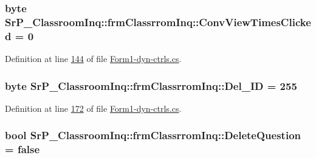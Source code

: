 \hypertarget{class_sr_p___classroom_inq_1_1frm_classrrom_inq_a8b7285b1ee1626d8ebdc99d4bd6046a8}{
\subsubsection[{\-Conv\-View\-Times\-Clicked}]{\setlength{\rightskip}{0pt plus 5cm}byte {\bf \-Sr\-P\-\_\-\-Classroom\-Inq\-::frm\-Classrrom\-Inq\-::\-Conv\-View\-Times\-Clicked} = 0}}
\label{class_sr_p___classroom_inq_1_1frm_classrrom_inq_a8b7285b1ee1626d8ebdc99d4bd6046a8}


\-Definition at line \hyperlink{_form1-dyn-ctrls_8cs_source_l00144}{144} of file \hyperlink{_form1-dyn-ctrls_8cs_source}{\-Form1-\/dyn-\/ctrls.\-cs}.

\hypertarget{class_sr_p___classroom_inq_1_1frm_classrrom_inq_a9874b3534409b79a483f08f2aa03668d}{
\subsubsection[{\-Del\-\_\-\-I\-D}]{\setlength{\rightskip}{0pt plus 5cm}byte {\bf \-Sr\-P\-\_\-\-Classroom\-Inq\-::frm\-Classrrom\-Inq\-::\-Del\-\_\-\-I\-D} = 255}}
\label{class_sr_p___classroom_inq_1_1frm_classrrom_inq_a9874b3534409b79a483f08f2aa03668d}


\-Definition at line \hyperlink{_form1-dyn-ctrls_8cs_source_l00172}{172} of file \hyperlink{_form1-dyn-ctrls_8cs_source}{\-Form1-\/dyn-\/ctrls.\-cs}.

\hypertarget{class_sr_p___classroom_inq_1_1frm_classrrom_inq_ab3a8803fac827da5757e7451c1836010}{
\subsubsection[{\-Delete\-Question}]{\setlength{\rightskip}{0pt plus 5cm}bool {\bf \-Sr\-P\-\_\-\-Classroom\-Inq\-::frm\-Classrrom\-Inq\-::\-Delete\-Question} = false}}
\label{class_sr_p___classroom_inq_1_1frm_classrrom_inq_ab3a8803fac827da5757e7451c1836010}


